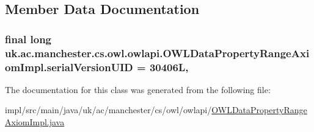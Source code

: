 \subsection{Member Data Documentation}
\hypertarget{classuk_1_1ac_1_1manchester_1_1cs_1_1owl_1_1owlapi_1_1_o_w_l_data_property_range_axiom_impl_a4ec69a040a4efa11fbce7a48d648d06e}{
\subsubsection[{serial\-Version\-U\-I\-D}]{\setlength{\rightskip}{0pt plus 5cm}final long uk.\-ac.\-manchester.\-cs.\-owl.\-owlapi.\-O\-W\-L\-Data\-Property\-Range\-Axiom\-Impl.\-serial\-Version\-U\-I\-D = 30406\-L\hspace{0.3cm}{\ttfamily [static]}, {\ttfamily [private]}}}\label{classuk_1_1ac_1_1manchester_1_1cs_1_1owl_1_1owlapi_1_1_o_w_l_data_property_range_axiom_impl_a4ec69a040a4efa11fbce7a48d648d06e}


The documentation for this class was generated from the following file\-:\begin{DoxyCompactItemize}
\item 
impl/src/main/java/uk/ac/manchester/cs/owl/owlapi/\hyperlink{_o_w_l_data_property_range_axiom_impl_8java}{O\-W\-L\-Data\-Property\-Range\-Axiom\-Impl.\-java}\end{DoxyCompactItemize}
